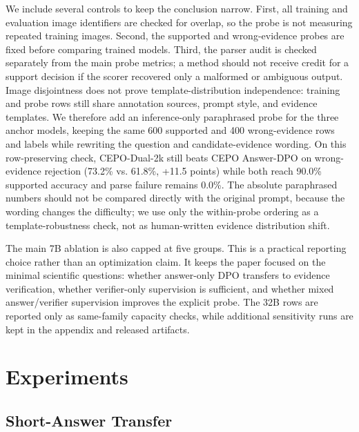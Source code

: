 \documentclass[10pt,twocolumn,letterpaper]{article}
\newcommand{\answerdpo}{CEPO Answer-DPO}
\newcommand{\dualtwok}{CEPO-Dual-2k}
\begin{document}
We include several controls to keep the conclusion narrow. First, all training
and evaluation image identifiers are checked for overlap, so the probe is not
measuring repeated training images. Second, the supported and wrong-evidence
probes are fixed before comparing trained models. Third, the parser audit is
checked separately from the main probe metrics; a method should not receive
credit for a support decision if the scorer recovered only a malformed or
ambiguous output.
Image disjointness does not prove template-distribution independence: training
and probe rows still share annotation sources, prompt style, and evidence
templates. We therefore add an inference-only paraphrased probe for the three
anchor models, keeping the same 600 supported and 400 wrong-evidence rows and
labels while rewriting the question and candidate-evidence wording. On this
row-preserving check, \dualtwok{} still beats \answerdpo{} on wrong-evidence
rejection (73.2\% vs. 61.8\%, +11.5 points) while both reach 90.0\%
supported accuracy and parse failure remains 0.0\%. The absolute paraphrased
numbers should not be compared directly with the original prompt, because the
wording changes the difficulty; we use only the within-probe ordering as a
template-robustness check, not as human-written evidence distribution shift.

The main 7B ablation is also capped at five groups. This is a practical
reporting choice rather than an optimization claim. It keeps the paper focused
on the minimal scientific questions: whether answer-only DPO transfers to
evidence verification, whether verifier-only supervision is sufficient, and
whether mixed answer/verifier supervision improves the explicit probe. The 32B
rows are reported only as same-family capacity checks, while additional
sensitivity runs are kept in the appendix and released artifacts.

\section{Experiments}

\subsection{Short-Answer Transfer}
\end{document}
